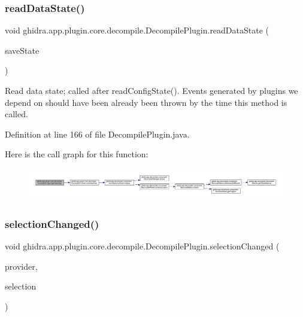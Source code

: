 \subsubsection{\texorpdfstring{readDataState()}{readDataState()}}
{\footnotesize\ttfamily void ghidra.\+app.\+plugin.\+core.\+decompile.\+Decompile\+Plugin.\+read\+Data\+State (\begin{DoxyParamCaption}\item[{Save\+State}]{save\+State }\end{DoxyParamCaption})\hspace{0.3cm}{\ttfamily [inline]}}

Read data state; called after read\+Config\+State(). Events generated by plugins we depend on should have been already been thrown by the time this method is called. 

Definition at line 166 of file Decompile\+Plugin.\+java.

Here is the call graph for this function\+:
\nopagebreak
\begin{figure}[H]
\begin{center}
\leavevmode
\includegraphics[width=350pt]{classghidra_1_1app_1_1plugin_1_1core_1_1decompile_1_1_decompile_plugin_a60c3bde2ea8b6488190f86e0f9da432b_cgraph}
\end{center}
\end{figure}
\mbox{\label{classghidra_1_1app_1_1plugin_1_1core_1_1decompile_1_1_decompile_plugin_a9c2782ea5bd9d52ed1e1c67e1eb63c75}} 
\subsubsection{\texorpdfstring{selectionChanged()}{selectionChanged()}}
{\footnotesize\ttfamily void ghidra.\+app.\+plugin.\+core.\+decompile.\+Decompile\+Plugin.\+selection\+Changed (\begin{DoxyParamCaption}\item[{\mbox{\hyperlink{classghidra_1_1app_1_1plugin_1_1core_1_1decompile_1_1_decompiler_provider}{Decompiler\+Provider}}}]{provider,  }\item[{Program\+Selection}]{selection }\end{DoxyParamCaption})\hspace{0.3cm}{\ttfamily [inline]}}



